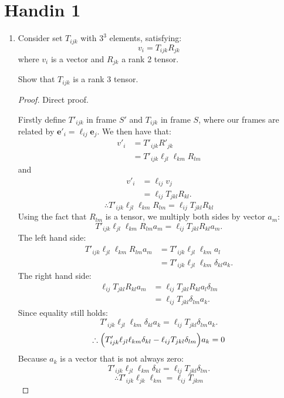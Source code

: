 \pagestyle{fancy}
\fancyhead{}

\section{Handin 1}
\begin{enumerate}
    \item Consider set $T_{ijk}$ with $3^3$ elements, satisfying:
    $$v_i=T_{ijk}R_{jk}$$
    where $v_i$ is a vector and $R_{jk}$ a rank 2 tensor. 
    
    Show that $T_{ijk}$ is a rank 3 tensor. \\

    \begin{proof}
    Direct proof.
    
    Firstly define $T'_{ijk}$ in frame $S'$ and $T_{ijk}$ in frame $S$, where our frames are related by $\boldsymbol{e}'_i=\ell_{ij}\boldsymbol{e}_j$.
    We then have that:
    \begin{align*}
        v'_i
        &=T'_{ijk}R'_{jk} \\
        &=T'_{ijk}\ell_{jl}\ell_{km}R_{lm}
    \end{align*}
    and
    \begin{align*}
        v'_i
        &=\ell_{ij}v_j \\
        &=\ell_{ij}T_{jkl}R_{kl}.
    \end{align*}
    $$\therefore T'_{ijk}\ell_{jl}\ell_{km}R_{lm}
    =\ell_{ij}T_{jkl}R_{kl}$$
    Using the fact that $R_{lm}$ is a tensor, we multiply both sides by vector $a_m$:
    $$T'_{ijk}\ell_{jl}\ell_{km}R_{lm}a_m
    =\ell_{ij}T_{jkl}R_{kl}a_m.$$
    The left hand side:
    \begin{align*}
        T'_{ijk}\ell_{jl}\ell_{km}R_{lm}a_m
        &=T'_{ijk}\ell_{jl}\ell_{km}a_l \\
        &=T'_{ijk}\ell_{jl}\ell_{km}\delta_{kl}a_k.
    \end{align*}
    The right hand side:
    \begin{align*}
        \ell_{ij}T_{jkl}R_{kl}a_m
        &=\ell_{ij}T_{jkl}R_{kl}a_l\delta_{lm} \\
        &=\ell_{ij}T_{jkl}\delta_{lm}a_k.
    \end{align*}
    Since equality still holds:
    $$T'_{ijk}\ell_{jl}\ell_{km}\delta_{kl}a_k
    =\ell_{ij}T_{jkl}\delta_{lm}a_k.$$
    $$\therefore\Bigl(T'_{ijk}\ell_{jl}\ell_{km}\delta_{kl}
    -\ell_{ij}T_{jkl}\delta_{lm}\Bigl)a_k=0$$
    Because $a_k$ is a vector that is not always zero:
    $$T'_{ijk}\ell_{jl}\ell_{km}\delta_{kl}=
    \ell_{ij}T_{jkl}\delta_{lm}.$$
    $$\therefore T'_{ijk}\ell_{jk}\ell_{km}=
    \ell_{ij}T_{jkm}$$


\end{proof}
\end{enumerate}
